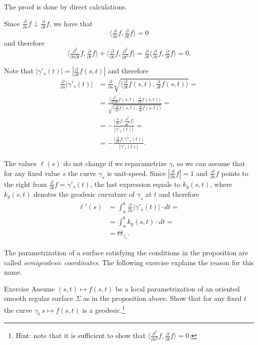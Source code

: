 The proof is done by direct calculations.

Since $\tfrac{\partial}{\partial s}f\perp \tfrac{\partial}{\partial t}f$, we have that
\[\langle\tfrac{\partial}{\partial s}f, \tfrac{\partial}{\partial t}f\rangle=0\]
and therefore
\[\langle\tfrac{\partial^2}{\partial s\partial t}f, \tfrac{\partial}{\partial t}f\rangle
+\langle\tfrac{\partial}{\partial s}f, \tfrac{\partial^2}{\partial t^2}f\rangle=\tfrac{\partial}{\partial t}\langle\tfrac{\partial}{\partial s}f, \tfrac{\partial}{\partial t}f\rangle=0.\]

Note that $|\gamma'_s(t)|=|\tfrac{\partial}{\partial t}f(s,t)|$ and therefore
\begin{align*}
\tfrac \partial {\partial s}|\gamma'_s(t)|&=\tfrac \partial {\partial s}\sqrt{\langle \tfrac{\partial}{\partial t}f(s,t),\tfrac{\partial}{\partial t}f(s,t)\rangle}=
\\
&=\frac{\langle \tfrac{\partial^2}{\partial s\partial t}f(s,t),\tfrac{\partial}{\partial t}f(s,t)\rangle}{\sqrt{\langle \tfrac{\partial}{\partial t}f(s,t),\tfrac{\partial}{\partial t}f(s,t)\rangle}}=
\\
&=-\frac{\langle\tfrac{\partial}{\partial s}f, \tfrac{\partial^2}{\partial t^2}f\rangle}{|\gamma'_s(t)|}=
\\
&=-\frac{\langle\tfrac{\partial}{\partial s}f, \gamma''_s(t)\rangle}{|\gamma'_s(t)|}.
\end{align*}

The values $\ell(s)$ do not change if we reparametrize $\gamma$,
so we can assume that for any fixed value $s$ the curve $\gamma_s$ is unit-speed.
Since $|\tfrac{\partial}{\partial s}f|=1$ and $\tfrac{\partial}{\partial s}f$ points to the right from $\tfrac{\partial}{\partial t}f=\gamma'_s(t)$, the last expression equals to $k_g(s,t)$,
where $k_g(s,t)$ denotes the geodesic curvature of $\gamma_s$ at $t$ and therefore
\begin{align*}
\ell'(s)&= \int_a^b \tfrac \partial {\partial s} |\gamma'_s(t)|\cdot dt =
\\
&= \int_a^b k_g(s,t)\cdot dt=
\\
&=\Theta_{\gamma_s}.
\end{align*}
\qedsf

The parametrization of a surface satisfying the conditions in the proposition are called \emph{semigeodesic coordinates}.
The following exercise explains the reason for this name.

\begin{thm}{Exercise}
Assume $(s,t)\mapsto f(s,t)$ be a local parametrization of an oriented smooth regular surface $\Sigma$ as in the proposition above.
Show that for any fixed $t$ the curve $\gamma_t\:s\mapsto f(s,t)$ is a geodesic.\footnote{Hint: note that it is sufficient to show that $\langle\tfrac{\partial^2}{\partial s^2}f,\tfrac{\partial}{\partial t}f\rangle=0$.}
\end{thm}


